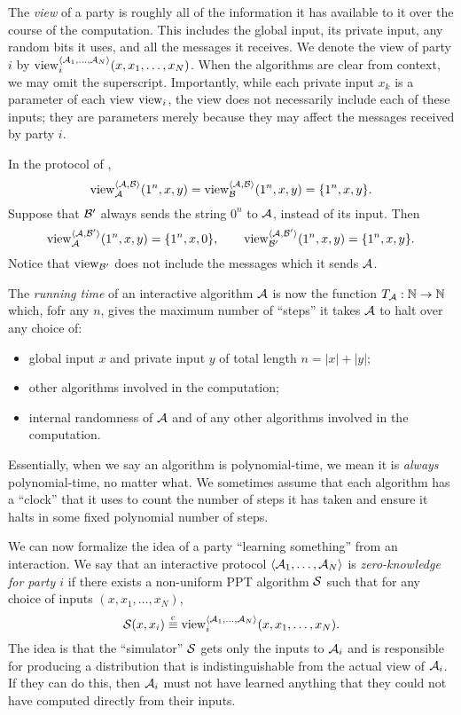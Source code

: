 The \emph{view} of a party is roughly all of the information it has available to
it over the course of the computation. This includes the global input, its
private input, any random bits it uses, and all the messages it receives. We
denote the view of party $i$ by $\operatorname{view}_i^{\langle\mathcal{A}_1, \dots, \mathcal{A}_N\rangle}(x, x_1,
\dots, x_N)$. When the algorithms are clear from context, we may omit the
superscript. Importantly, while each private input $x_k$ is a parameter of each
view $\operatorname{view}_i$, the view does not necessarily include each of these inputs; they
are parameters merely because they may affect the messages received by party
$i$.

\begin{ex}
  In the protocol of , \[
    \operatorname{view}_{\mathcal{A}}^{\langle\mathcal{A}, \mathcal{B}\rangle}(1^n, x, y) = \operatorname{view}_{\mathcal{B}}^{\langle\mathcal{A}, \mathcal{B}\rangle}(1^n, x, y) = \{1^n, x, y\}.
  \]
  Suppose that $\mathcal{B}'$ always sends the string $0^n$ to $\mathcal{A}$, instead of its input. Then \[
    \operatorname{view}_{\mathcal{A}}^{\langle\mathcal{A}, \mathcal{B}'\rangle}(1^n, x, y) = \{1^n, x, 0\},\quad\quad \operatorname{view}_{\mathcal{B}'}^{\langle\mathcal{A}, \mathcal{B}'\rangle}(1^n, x, y) = \{1^n, x, y\}.
  \]
  Notice that $\operatorname{view}_{\mathcal{B}'}$ does not include the messages which it sends $\mathcal{A}$.
\end{ex}


The \emph{running time} of an interactive algorithm $\mathcal{A}$ is now the function
$T_{\mathcal{A}}: \mathbb{N}\to\mathbb{N}$ which, fofr any $n$, gives the maximum number of ``steps'' it
takes $\mathcal{A}$ to halt over any choice of:
\begin{itemize}
  \item global input $x$ and private input $y$ of total length $n = |x| + |y|$;
  \item other algorithms involved in the computation;
  \item internal randomness of $\mathcal{A}$ and of any other algorithms involved in the computation.
\end{itemize}
Essentially, when we say an algorithm is polynomial-time, we mean it is
\emph{always} polynomial-time, no matter what. We sometimes assume that each
algorithm has a ``clock'' that it uses to count the number of steps it has taken
and ensure it halts in some fixed polynomial number of steps.

We can now formalize the idea of a party ``learning something'' from an
interaction. We say that an interactive protocol $\langle\mathcal{A}_1, \dots, \mathcal{A}_N\rangle$ is
\emph{zero-knowledge for party $i$} if there exists a non-uniform PPT algorithm
$\mathcal{S}$ such that for any choice of inputs $(x, x_1, \dots, x_N)$, \[
  \mathcal{S}(x, x_i) \overset{\text{c}}{\equiv} \operatorname{view}_i^{\langle\mathcal{A}_1, \dots, \mathcal{A}_N\rangle}(x, x_1, \dots, x_N).
\]
The idea is that the ``simulator'' $\mathcal{S}$ gets only the inputs to $\mathcal{A}_i$ and is
responsible for producing a distribution that is indistinguishable from the
actual view of $\mathcal{A}_i$. If they can do this, then $\mathcal{A}_i$ must not have learned
anything that they could not have computed directly from their inputs.

